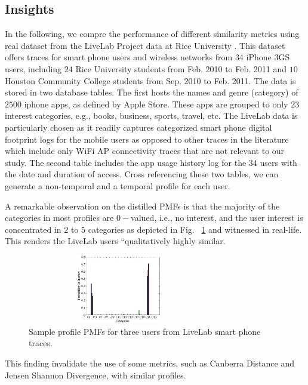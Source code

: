 \documentclass{elsarticle}
\begin{document}
\subsection{Insights }

In the following, we compre the performance of different similarity
metrics using real dataset from the LiveLab Project data at Rice University
\citet{data}. This dataset offers traces for smart phone users and
wireless networks from $34$ iPhone 3GS users, including $24$ Rice
University students from Feb. 2010 to Feb. 2011 and $10$ Houston
Community College students from Sep. 2010 to Feb. 2011. The data is
stored in two database tables. The first hosts the names and genre
(category) of $2500$ iphone apps, as defined by Apple Store. These
apps are grouped to only $23$ interest categories, e.g., books, business,
sports, travel, etc. The LiveLab data is particularly chosen as it
readily captures categorized smart phone digital footprint logs for
the mobile users as opposed to other traces in the literature which
include only WiFi AP connectivity traces that are not relevant to
our study. The second table includes the app usage history log for
the 34 users with the date and duration of access. Cross referencing
these two tables, we can generate a non-temporal and a temporal profile
for each user.

\begin{flushleft}
A remarkable observation on the distilled PMFs is that the majority
of the categories in most profiles are $0-$valued, i.e., no interest,
and the user interest is concentrated in $2$ to $5$ categories as
depicted in Fig. ~\ref{fig:SampleProfile} and witnessed in real-life.
This renders the LiveLab users ``qualitatively\textquotedbl{} highly
similar. 
\begin{figure}[!tp]
\centerline{\includegraphics[width=8cm,height=3cm]{User2}} \caption{Sample profile PMFs for three users from LiveLab smart phone traces.\label{fig:SampleProfile} }
\end{figure}
 This finding invalidate the use of some metrics, such as Canberra
Distance and Jensen Shannon Divergence, with similar profiles. 
\par\end{flushleft}
\end{document}
